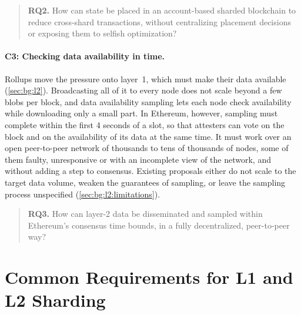 \begin{quote}
	\textbf{RQ2.} How can state be placed in an account-based sharded blockchain to reduce cross-shard transactions, without centralizing placement decisions or exposing them to selfish optimization?
\end{quote}

\paragraph{C3: Checking data availability in time.}
Rollups move the pressure onto layer~1, which must make their data available (\autoref{sec:bg:l2}).
Broadcasting all of it to every node does not scale beyond a few blobs per block, and data availability sampling lets each node check availability while downloading only a small part.
In Ethereum, however, sampling must complete within the first 4 seconds of a slot, so that attesters can vote on the block and on the availability of its data at the same time.
It must work over an open peer-to-peer network of thousands to tens of thousands of nodes, some of them faulty, unresponsive or with an incomplete view of the network, and without adding a step to consensus.
Existing proposals either do not scale to the target data volume, weaken the guarantees of sampling, or leave the sampling process unspecified (\autoref{sec:bg:l2:limitations}).

\begin{quote}
	\textbf{RQ3.} How can layer-2 data be disseminated and sampled within Ethereum's consensus time bounds, in a fully decentralized, peer-to-peer way?
\end{quote}

\section{Common Requirements for L1 and L2 Sharding}\label{sec:bg:requirements}


